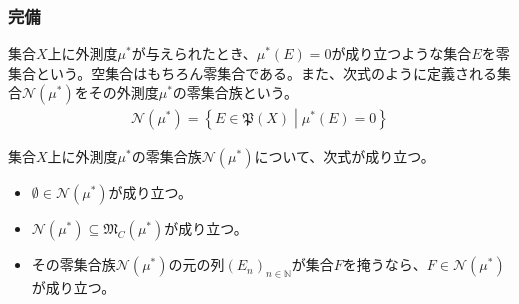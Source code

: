\documentclass[dvipdfmx]{jsarticle}
\begin{document}
\subsubsection{完備}%
\begin{dfn}
集合$X$上に外測度$\mu^{*}$が与えられたとき、$\mu^{*}(E) = 0$が成り立つような集合$E$を零集合という。空集合はもちろん零集合である。また、次式のように定義される集合$\mathcal{N}\left( \mu^{*} \right)$をその外測度$\mu^{*}$の零集合族という。
\begin{align*}
\mathcal{N}\left( \mu^{*} \right) = \left\{ E \in \mathfrak{P}(X) \middle| \mu^{*}(E) = 0 \right\}
\end{align*}
\end{dfn}
\begin{thm}\label{4.5.3.15}
集合$X$上に外測度$\mu^{*}$の零集合族$\mathcal{N}\left( \mu^{*} \right)$について、次式が成り立つ。
\begin{itemize}
\item
  $\mathcal{\emptyset \in N}\left( \mu^{*} \right)$が成り立つ。
\item
  $\mathcal{N}\left( \mu^{*} \right) \subseteq \mathfrak{M}_{C}\left( \mu^{*} \right)$が成り立つ。
\item
  その零集合族$\mathcal{N}\left( \mu^{*} \right)$の元の列$\left( E_{n} \right)_{n \in \mathbb{N}}$が集合$F$を掩うなら、$F \in \mathcal{N}\left( \mu^{*} \right)$が成り立つ。
\end{itemize}
\end{thm}
\end{document}
